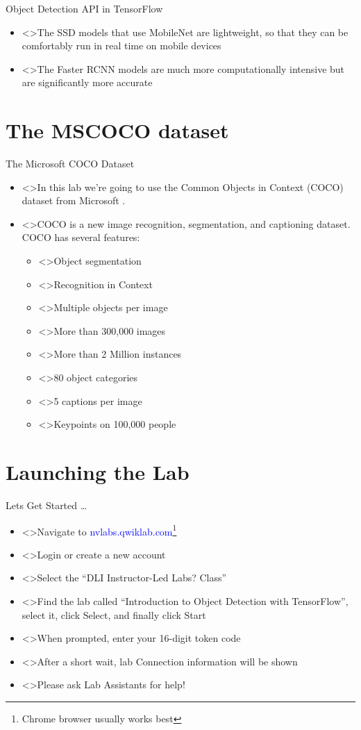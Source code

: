 \documentclass[handout]{beamer}
\begin{document}
\begin{frame}{Object Detection API in TensorFlow}
\begin{itemize}
\itemsep 1em
	\item<>The SSD models that use MobileNet are lightweight, so that they can be comfortably run in real time on mobile devices
	\item<>The Faster RCNN models are much more computationally intensive but are significantly more accurate	
\end{itemize}
\end{frame}


\section{The MSCOCO dataset}
\begin{frame}{The Microsoft COCO Dataset}
\begin{itemize}
\itemsep 1em
	\item<>In this lab we're going to use the Common Objects in Context (COCO) dataset from Microsoft .
	\item<>COCO is a new image recognition, segmentation, and captioning dataset. COCO has several features:
	\begin{itemize}[square]
		\item<>Object segmentation
		\item<>Recognition in Context
		\item<>Multiple objects per image
		\item<>More than 300,000 images
		\item<>More than 2 Million instances
		\item<>80 object categories
		\item<>5 captions per image
		\item<>Keypoints on 100,000 people
	\end{itemize}
\end{itemize}
\end{frame}


\section{Launching the Lab}
\begin{frame}{Lets Get Started \ldots}
\begin{itemize}
\itemsep 1em
	\item<>Navigate to \textcolor{blue}{nvlabs.qwiklab.com}\footnote{Chrome browser usually works best}
	\item<>Login or create a new account
	\item<>Select the \enquote{DLI Instructor-Led Labs? Class}
	\item<>Find the lab called \enquote{Introduction to Object Detection with TensorFlow}, select it, click Select, and finally click Start
	\item<>When prompted, enter your 16-digit token code
	\item<>After a short wait, lab Connection information will be shown
	\item<>Please ask Lab Assistants for help!
\end{itemize}
\end{frame}
\end{document}
